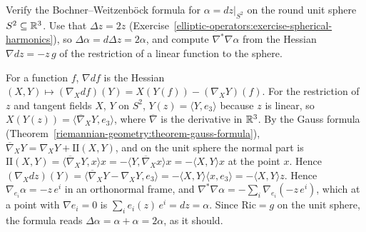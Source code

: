 \begin{exercise}\label{hodge-theorem:exercise-weitzenbock-sphere}
Verify the Bochner--Weitzenb\"ock formula for $\alpha = dz|_{S^2}$ on the round unit sphere $S^2 \subseteq \mathbb{R}^3$. Use that $\Delta z = 2z$ (Exercise~\ref{elliptic-operators:exercise-spherical-harmonics}), so
$\Delta\alpha = d\Delta z = 2\alpha$, and compute $\nabla^*\nabla\alpha$ from the Hessian $\nabla dz = -z\,g$ of the restriction of a linear function to the sphere.
\end{exercise}

\begin{solution}
For a function $f$, $\nabla df$ is the Hessian $(X, Y) \mapsto (\nabla_Xdf)(Y) = X(Y(f)) - (\nabla_XY)(f)$. For the restriction of $z$ and tangent fields $X$, $Y$ on $S^2$, $Y(z) = \langle Y, e_3\rangle$
because $z$ is linear, so $X(Y(z)) = \langle\overline\nabla_XY, e_3\rangle$, where $\overline\nabla$ is the derivative in $\mathbb{R}^3$. By the Gauss formula (Theorem~\ref{riemannian-geometry:theorem-gauss-formula}),
$\overline\nabla_XY = \nabla_XY + \mathrm{II}(X, Y)$, and on the unit sphere the normal part is $\mathrm{II}(X, Y) = \langle\overline\nabla_XY, x\rangle x = -\langle Y, \overline\nabla_Xx\rangle x = -\langle X, Y\rangle x$ at the point $x$.
Hence $(\nabla_Xdz)(Y) = \langle\overline\nabla_XY - \nabla_XY, e_3\rangle = -\langle X, Y\rangle\langle x, e_3\rangle = -\langle X, Y\rangle z$. Hence $\nabla_{e_i}\alpha = -z\,e^i$ in an orthonormal frame, and
$\nabla^*\nabla\alpha = -\sum_i\nabla_{e_i}(-z\,e^i)$, which at a point with $\nabla e_i = 0$ is $\sum_ie_i(z)\,e^i = dz = \alpha$. Since $\mathrm{Ric} = g$ on the unit sphere, the formula reads
$\Delta\alpha = \alpha + \alpha = 2\alpha$, as it should.
\end{solution}

